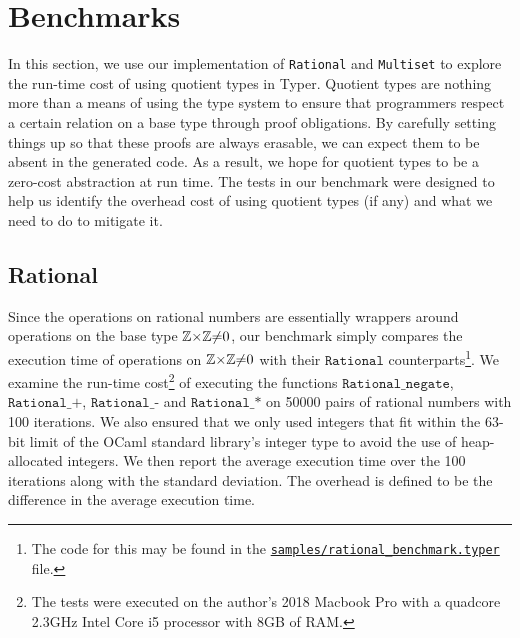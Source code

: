 \documentclass[12pt,twoside,maitrise]{dms}
\theoremstyle{definition}
\numberwithin{equation}{section}
\numberwithin{table}{chapter}
\numberwithin{figure}{chapter}
\newcommand\id[1] {\texttt{#1}}
\newcommand\fn[1] {\texttt{#1}}
\begin{document}
\section*{Benchmarks}\label{sec:quot-benchmark}

In this section, we use our implementation of \id{Rational} and \id{Multiset}
to explore the run-time cost of using quotient types in Typer. Quotient types
are nothing more than a means of using the type system to ensure that
programmers respect a certain relation on a base type through proof
obligations. By carefully setting things up so that these proofs are always
erasable, we can expect them to be absent in the generated code. As a result,
we hope for quotient types to be a zero-cost abstraction at run time. The tests
in our benchmark were designed to help us identify the overhead cost of using
quotient types (if any) and what we need to do to mitigate it.

\subsection*{Rational}

Since the operations on rational numbers are essentially wrappers around
operations on the base type $\mathbb{Z}{\times}\mathbb{Z}{\ne}0$, our benchmark simply compares the
execution time of operations on $\mathbb{Z}{\times}\mathbb{Z}{\ne}0$ with their $\fn{Rational}$
counterparts\footnote{The code for this may be found in the
\href{https://gitlab.com/jamestjw/typer/-/blob/quot-types-v1.0.0/samples/rational_benchmark.typer}{\id{samples/rational\_benchmark.typer}}
file.}. We examine the run-time cost\footnote{The tests were executed on the
author's 2018 Macbook Pro with a quadcore 2.3GHz Intel Core i5 processor with
8GB of RAM.} of executing the functions $\fn{Rational\_negate}$,
$\fn{Rational\_+}$, $\fn{Rational\_-}$ and $\fn{Rational\_*}$ on 50000 pairs of
rational numbers with 100 iterations. We also ensured that we only used
integers that fit within the 63-bit limit of the OCaml standard library's
integer type to avoid the use of heap-allocated integers. We then report the
average execution time over the 100 iterations along with the standard
deviation. The overhead is defined to be the difference in the average
execution time.
\end{document}
